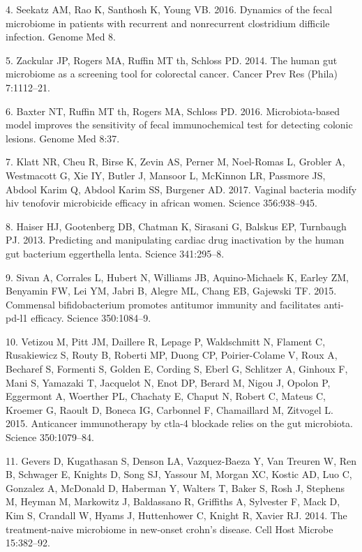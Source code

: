 \documentclass[12pt,]{article}
\begin{document}
\hypertarget{ref-Seekatz_cdiff_2016}{}
4. Seekatz AM, Rao K, Santhosh K, Young VB. 2016. Dynamics of the fecal
microbiome in patients with recurrent and nonrecurrent clostridium
difficile infection. Genome Med 8.

\hypertarget{ref-zackular_CRC_2014}{}
5. Zackular JP, Rogers MA, Ruffin MT th, Schloss PD. 2014. The human gut
microbiome as a screening tool for colorectal cancer. Cancer Prev Res
(Phila) 7:1112--21.

\hypertarget{ref-baxter_FIT_2016}{}
6. Baxter NT, Ruffin MT th, Rogers MA, Schloss PD. 2016.
Microbiota-based model improves the sensitivity of fecal immunochemical
test for detecting colonic lesions. Genome Med 8:37.

\hypertarget{ref-Klatt_microbicide_2017}{}
7. Klatt NR, Cheu R, Birse K, Zevin AS, Perner M, Noel-Romas L, Grobler
A, Westmacott G, Xie IY, Butler J, Mansoor L, McKinnon LR, Passmore JS,
Abdool Karim Q, Abdool Karim SS, Burgener AD. 2017. Vaginal bacteria
modify hiv tenofovir microbicide efficacy in african women. Science
356:938--945.

\hypertarget{ref-Haiser_cardiac_2013}{}
8. Haiser HJ, Gootenberg DB, Chatman K, Sirasani G, Balskus EP,
Turnbaugh PJ. 2013. Predicting and manipulating cardiac drug
inactivation by the human gut bacterium eggerthella lenta. Science
341:295--8.

\hypertarget{ref-Sivan_cancer_2015}{}
9. Sivan A, Corrales L, Hubert N, Williams JB, Aquino-Michaels K, Earley
ZM, Benyamin FW, Lei YM, Jabri B, Alegre ML, Chang EB, Gajewski TF.
2015. Commensal bifidobacterium promotes antitumor immunity and
facilitates anti-pd-l1 efficacy. Science 350:1084--9.

\hypertarget{ref-Vetizou_cancer_2015}{}
10. Vetizou M, Pitt JM, Daillere R, Lepage P, Waldschmitt N, Flament C,
Rusakiewicz S, Routy B, Roberti MP, Duong CP, Poirier-Colame V, Roux A,
Becharef S, Formenti S, Golden E, Cording S, Eberl G, Schlitzer A,
Ginhoux F, Mani S, Yamazaki T, Jacquelot N, Enot DP, Berard M, Nigou J,
Opolon P, Eggermont A, Woerther PL, Chachaty E, Chaput N, Robert C,
Mateus C, Kroemer G, Raoult D, Boneca IG, Carbonnel F, Chamaillard M,
Zitvogel L. 2015. Anticancer immunotherapy by ctla-4 blockade relies on
the gut microbiota. Science 350:1079--84.

\hypertarget{ref-gevers_pedsCD_2014}{}
11. Gevers D, Kugathasan S, Denson LA, Vazquez-Baeza Y, Van Treuren W,
Ren B, Schwager E, Knights D, Song SJ, Yassour M, Morgan XC, Kostic AD,
Luo C, Gonzalez A, McDonald D, Haberman Y, Walters T, Baker S, Rosh J,
Stephens M, Heyman M, Markowitz J, Baldassano R, Griffiths A, Sylvester
F, Mack D, Kim S, Crandall W, Hyams J, Huttenhower C, Knight R, Xavier
RJ. 2014. The treatment-naive microbiome in new-onset crohn's disease.
Cell Host Microbe 15:382--92.
\end{document}
